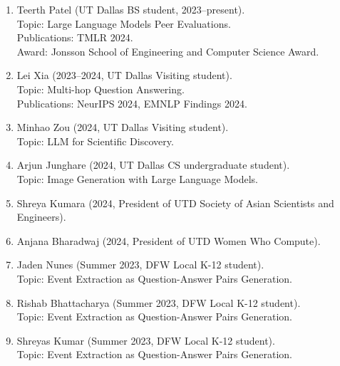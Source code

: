 \begin{enumerate}[label={},leftmargin=15pt]

\item \noindent Teerth Patel (UT Dallas BS student, 2023--present). \\
Topic: Large Language Models Peer Evaluations.  \\
Publications: TMLR 2024. \\
Award: Jonsson School of Engineering and Computer Science Award.

\vspace{0.3mm}
\item Lei Xia (2023--2024, UT Dallas Visiting student). \\
Topic: Multi-hop Question Answering. \\
Publications: NeurIPS 2024, EMNLP Findings 2024.

\vspace{0.3mm}
\item Minhao Zou (2024, UT Dallas Visiting student). \\
Topic: LLM for Scientific Discovery.

\vspace{0.3mm}
\item Arjun Junghare (2024, UT Dallas CS undergraduate student). \\
Topic: Image Generation with Large Language Models.

\vspace{0.3mm}
\item Shreya Kumara (2024, President of UTD Society of Asian Scientists and Engineers).

\vspace{0.3mm}
\item Anjana Bharadwaj (2024, President of UTD Women Who Compute).

\vspace{0.3mm}
\item Jaden Nunes (Summer 2023, DFW Local K-12 student). \\
Topic: Event Extraction as Question-Answer Pairs Generation.

\vspace{0.3mm}
\item Rishab Bhattacharya (Summer 2023, DFW Local K-12 student). \\
Topic: Event Extraction as Question-Answer Pairs Generation.

\vspace{0.3mm}
\item Shreyas Kumar (Summer 2023, DFW Local K-12 student). \\
Topic: Event Extraction as Question-Answer Pairs Generation.


\end{enumerate}

